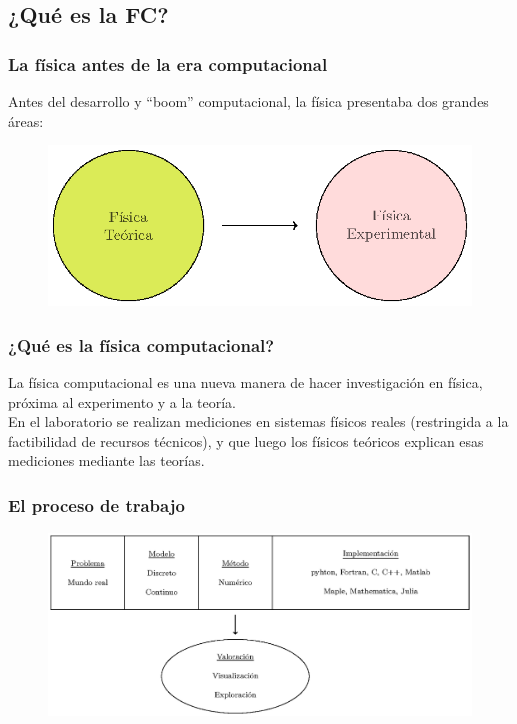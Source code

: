 \documentclass[12pt]{beamer}
\begin{document}
\subsection{¿Qué es la FC?}

\begin{frame}
\frametitle{La física antes de la era computacional}
Antes del desarrollo y \enquote{boom} computacional, la física presentaba dos grandes áreas:
\pause
\begin{figure}
	\centering
	\includegraphics[scale=1]{Imagenes/figura_02.eps}
	\end{figure}
\end{frame}
\begin{frame}
\frametitle{¿Qué es la física computacional?}
La física computacional es una nueva manera de hacer investigación en física, próxima al
experimento y a la teoría.
\\
\bigskip
\pause
En el laboratorio se realizan mediciones en sistemas físicos reales (restringida a la factibilidad de recursos técnicos), y que luego los físicos teóricos explican esas mediciones mediante las teorías.
\end{frame}
\begin{frame}[fragile]
\frametitle{El proceso de trabajo}
\begin{figure}
	\centering
	\hspace*{-1cm}
	\includegraphics[scale=0.7]{Imagenes/figura_03.eps}
\end{figure}
\end{frame}
\end{document}
